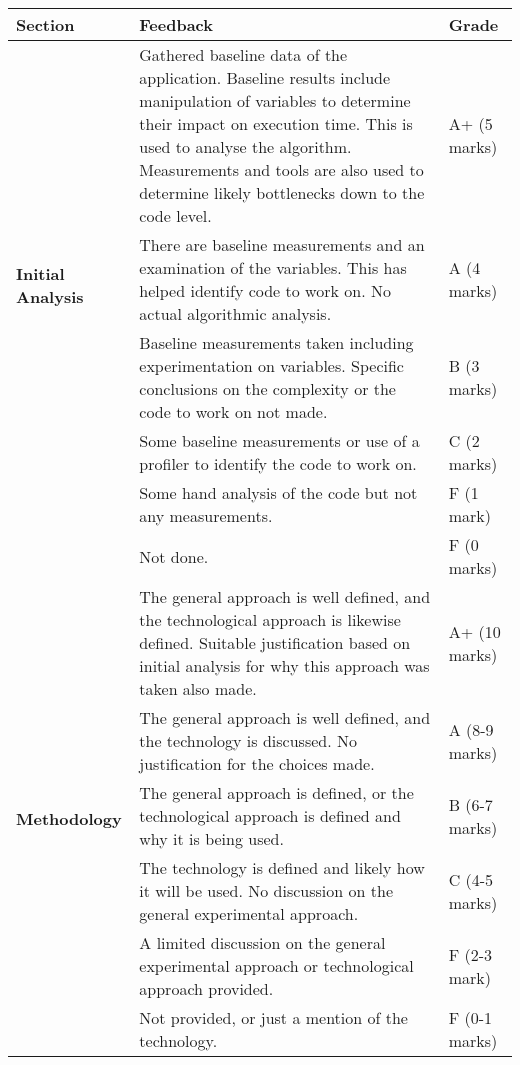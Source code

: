 \documentclass[a4paper, 12pt]{article}
\begin{document}
\begin{table}[H]
	\scriptsize
	\centering
	\begin{tabularx}{\textwidth}{|l|X|l|}
		\hline
		\textbf{Section} & \textbf{Feedback} & \textbf{Grade} \\
		\hline
		\multirow{5}{*}{\textbf{Initial Analysis}} & Gathered baseline data of the application. Baseline results include manipulation of variables to determine their impact on execution time. This is used to analyse the algorithm. Measurements and tools are also used to determine likely bottlenecks down to the code level. & A+ (5 marks) \\
		\cline{2-3}
		& There are baseline measurements and an examination of the variables. This has helped identify code to work on. No actual algorithmic analysis.& A (4 marks) \\
		\cline{2-3}
		& Baseline measurements taken including experimentation on variables.  Specific conclusions on the complexity or the code to work on not made. & B (3 marks) \\
		\cline{2-3}
		& Some baseline measurements or use of a profiler to identify the code to work on. & C (2 marks) \\
		\cline{2-3}
		& Some hand analysis of the code but not any measurements. & F (1 mark) \\
		\cline{2-3}
		& Not done. & F (0 marks) \\
		\hline
		\multirow{6}{*}{\textbf{Methodology}} & The general approach is well defined, and the technological approach is likewise defined. Suitable justification based on initial analysis for why this approach was taken also made. & A+ (10 marks) \\
		\cline{2-3}
		& The general approach is well defined, and the technology is discussed. No	justification for the choices made. & A (8-9 marks) \\
		\cline{2-3}
		& The general approach is defined, or the technological approach is defined and	why it is being used. & B (6-7 marks) \\
		\cline{2-3}
		& The technology is defined and likely how it will be used. No discussion on the general experimental approach. & C (4-5 marks) \\
		\cline{2-3}
		& A limited discussion on the general experimental approach or technological approach provided. & F (2-3 mark) \\
		\cline{2-3}
		& Not provided, or just a mention of the technology. & F (0-1 marks) \\

\end{tabularx}
\end{table}
\end{document}
